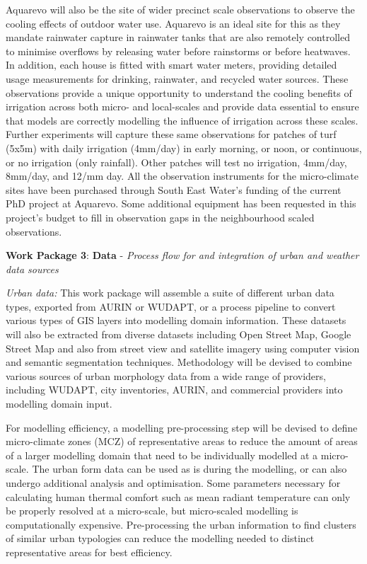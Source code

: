 Aquarevo will also be the site of wider precinct scale observations to observe the cooling effects of outdoor water use. Aquarevo is an ideal site for this as they mandate rainwater capture in rainwater tanks that are also remotely controlled to minimise overflows by releasing water before rainstorms or before heatwaves. In addition, each house is fitted with smart water meters, providing detailed usage measurements for drinking, rainwater, and recycled water sources. These observations provide a unique opportunity to understand the cooling benefits of irrigation across both micro- and local-scales and provide data essential to ensure that models are correctly modelling the influence of irrigation across these scales. Further experiments will capture these same observations for patches of turf (5x5m) with daily irrigation (4mm/day) in early morning, or noon, or continuous, or no irrigation (only rainfall). Other patches will test no irrigation, 4mm/day, 8mm/day, and 12/mm day. All the observation instruments for the micro-climate sites have been purchased through South East Water's funding of the current PhD project at Aquarevo. Some additional equipment has been requested in this project's budget to fill in observation gaps in the neighbourhood scaled observations.

\textbf{Work Package 3}: \textbf{Data} - \emph{Process flow for and integration of urban and weather data sources  }

\emph{Urban data:} This work package will assemble a suite of different urban data types, exported from AURIN or WUDAPT, or a process pipeline to convert various types of GIS layers into modelling domain information. These datasets will also be extracted from diverse datasets including Open Street Map, Google Street Map and also from street view and satellite imagery using computer vision and semantic segmentation techniques. Methodology will be devised to combine various sources of urban morphology data from a wide range of providers, including WUDAPT, city inventories, AURIN, and commercial providers into modelling domain input.

For modelling efficiency, a modelling pre-processing step will be devised to define micro-climate zones (MCZ) of representative areas to reduce the amount of areas of a larger modelling domain that need to be individually modelled at a micro-scale. The urban form data can be used as is during the modelling, or can also undergo additional analysis and optimisation. Some parameters necessary for calculating human thermal comfort such as mean radiant temperature can only be properly resolved at a micro-scale, but micro-scaled modelling is computationally expensive. Pre-processing the urban information to find clusters of similar urban typologies can reduce the modelling needed to distinct representative areas for best efficiency.

